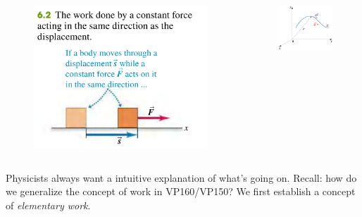 \documentclass[11pt, t]{beamer}
\newcommand{\nullspace}{~\\[15pt]}
\begin{document}
\begin{frame}[allowframebreaks]
\begin{columns}
        \begin{figure}[ht]
            \centering
            \includegraphics[width=\textwidth]{2020-07-15-10-14-01.png}
        \end{figure}
        \begin{figure}[ht]
            \centering
            \includegraphics[width=\textwidth]{2020-07-14-22-23-32.png}
        \end{figure}
    \end{columns}
    \newpage
    Physicists always want a intuitive explanation of what's going on. Recall: how do we generalize the concept of work in VP160/VP150? We first establish a concept of \textit{elementary work}.\nullspace

\end{frame}
\end{document}
